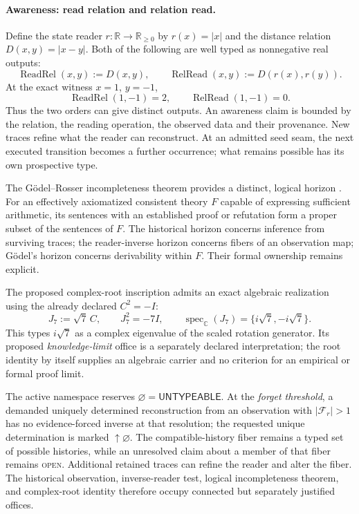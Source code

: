 \documentclass[10pt,letterpaper]{article}
\theoremstyle{definition}\newtheorem{definition}[theorem]{Definition}
\begin{document}
\paragraph{Awareness: read relation and relation read.}
Define the state reader $r:\mathbb R\to\mathbb R_{\ge0}$ by $r(x)=|x|$ and the distance relation $D(x,y)=|x-y|$. Both of the following are well typed as nonnegative real outputs:
\begin{equation}\label{eq:awareness}
 \operatorname{ReadRel}(x,y):=D(x,y),\qquad
 \operatorname{RelRead}(x,y):=D(r(x),r(y)).
\end{equation}
At the exact witness $x=1$, $y=-1$,
\begin{equation}\label{eq:awarenesswitness}
\boxed{\operatorname{ReadRel}(1,-1)=2,\qquad \operatorname{RelRead}(1,-1)=0.}
\end{equation}
Thus the two orders can give distinct outputs. An awareness claim is bounded by the relation, the reading operation, the observed data and their provenance. New traces refine what the reader can reconstruct. At an admitted seed seam, the next executed transition becomes a further occurrence; what remains possible has its own prospective type.

The G\"odel--Rosser incompleteness theorem provides a distinct, logical horizon \cite{godel1931,rosser1936}. For an effectively axiomatized consistent theory $F$ capable of expressing sufficient arithmetic, its sentences with an established proof or refutation form a proper subset of the sentences of $F$. The historical horizon concerns inference from surviving traces; the reader-inverse horizon concerns fibers of an observation map; G\"odel's horizon concerns derivability within $F$. Their formal ownership remains explicit.

The proposed complex-root inscription admits an exact algebraic realization using the already declared $C^2=-I$:
\begin{equation}\label{eq:root7}
 J_7:=\sqrt7\,C,\qquad J_7^2=-7I,\qquad
 \operatorname{spec}_{\mathbb C}(J_7)=\{i\sqrt7,-i\sqrt7\}.
\end{equation}
This types $i\sqrt7$ as a complex eigenvalue of the scaled rotation generator. Its proposed \emph{knowledge-limit} office is a separately declared interpretation; the root identity by itself supplies an algebraic carrier and no criterion for an empirical or formal proof limit.

The active namespace reserves $\varnothing=\mathsf{UNTYPEABLE}$. At the \emph{forget threshold}, a demanded uniquely determined reconstruction from an observation with $|\mathcal F_r|>1$ has no evidence-forced inverse at that resolution; the requested unique determination is marked $\uparrow\varnothing$. The compatible-history fiber remains a typed set of possible histories, while an unresolved claim about a member of that fiber remains \textsc{open}. Additional retained traces can refine the reader and alter the fiber. The historical observation, inverse-reader test, logical incompleteness theorem, and complex-root identity therefore occupy connected but separately justified offices.
\end{document}
